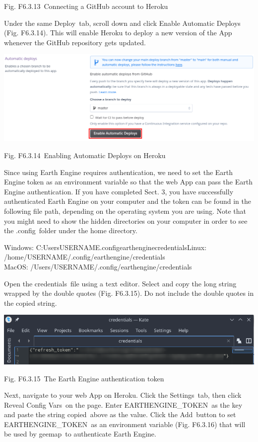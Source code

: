 \documentclass[
  letterpaper,
  DIV=11,
  numbers=noendperiod]{scrreprt}
\begin{document}
Fig. F6.3.13~Connecting a GitHub account to Heroku

Under the same Deploy~tab, scroll down and click Enable Automatic
Deploys (Fig. F6.3.14). This will enable Heroku to deploy a new version
of the App whenever the GitHub repository gets updated.

\includegraphics{./F6/image31.png}

Fig. F6.3.14~Enabling Automatic Deploys on Heroku

Since using Earth Engine requires authentication, we need to set the
Earth Engine token as an environment variable so that the web App can
pass the Earth Engine authentication. If you have completed Sect. 3, you
have successfully authenticated Earth Engine on your computer and the
token can be found in the following file path, depending on the
operating system you are using. Note that you might need to show the
hidden directories on your computer in order to see the .config~folder
under the home directory.

Windows: C:UsersUSERNAME.configearthenginecredentialsLinux:
/home/USERNAME/.config/earthengine/credentials\\
MacOS: /Users/USERNAME/.config/earthengine/credentials

Open the credentials~file using a text editor. Select and copy the long
string wrapped by the double quotes (Fig. F6.3.15). Do not include the
double quotes in the copied string.

\includegraphics{./F6/image68.png}

Fig. F6.3.15~The Earth Engine authentication token

Next, navigate to your web App on Heroku. Click the Settings~tab, then
click Reveal Config Vars~on the page. Enter EARTHENGINE\_TOKEN~as the
key and paste the string copied~above as the value. Click the Add~button
to set EARTHENGINE\_TOKEN~as an environment variable (Fig. F6.3.16) that
will be used by geemap~to authenticate Earth Engine.
\end{document}
